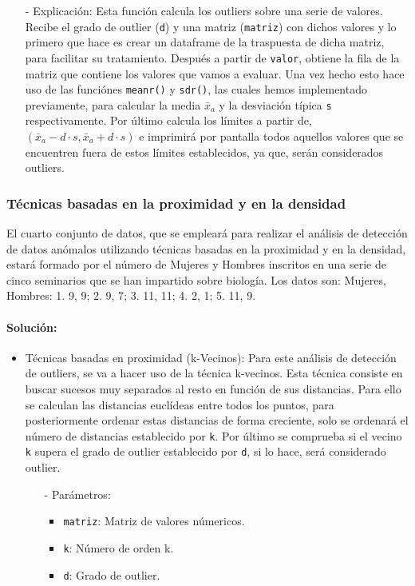 \documentclass[a4paper, 12pt]{article}
\begin{document}
{\begin{itemize}
\begin{itemize}
				\item[-] Explicación: Esta función calcula los outliers sobre una serie de valores. Recibe el grado de outlier (\texttt{d}) y una matriz (\texttt{matriz}) con dichos valores y lo primero que hace es crear un dataframe de la traspuesta de dicha matriz, para facilitar su tratamiento. Después a partir de \texttt{valor}, obtiene la fila de la matriz que contiene los valores que vamos a evaluar. Una vez hecho esto hace uso de las funciónes \texttt{meanr()} y \texttt{sdr()}, las cuales hemos implementado previamente, para calcular la media \texttt{$\bar{x}$$_{a}$} y la desviación típica \texttt{s} respectivamente. Por último calcula los límites a partir de, \texttt{$(\bar{x}_{a} - d \cdot s, \bar{x}_{a} + d \cdot s)$} e imprimirá por pantalla todos aquellos valores que se encuentren fuera de estos límites establecidos, ya que, serán considerados outliers.
			\end{itemize}
		\end{itemize}
		
		\subsubsection{Técnicas basadas en la proximidad y en la densidad}
		El cuarto conjunto de datos, que se empleará para realizar el análisis de detección de datos anómalos utilizando técnicas basadas en la proximidad y en la densidad, estará formado por el número de Mujeres y Hombres inscritos en una serie de cinco seminarios que se han impartido sobre biología. Los datos son: {Mujeres, Hombres}: 1. {9, 9}; 2. {9, 7}; 3. {11, 11}; 4. {2, 1}; 5. {11, 9}.
		
		\paragraph{Solución:}
		\begin{itemize}
			\item Técnicas basadas en proximidad (k-Vecinos): Para este análisis de detección de outliers, se va a hacer uso de la técnica k-vecinos. Esta técnica consiste en buscar sucesos muy separados al resto en función de sus distancias. Para ello se calculan las distancias euclídeas entre todos los puntos, para posteriormente ordenar estas distancias de forma creciente, solo se ordenará el número de distancias establecido por \texttt{k}. Por último se comprueba si el vecino \texttt{k} supera el grado de outlier establecido por \texttt{d}, si lo hace, será considerado outlier.
			\begin{itemize}
				\item[-] Parámetros:
				\begin{itemize}
					\item \texttt{matriz}: Matriz de valores númericos.
					\item \texttt{k}: Número de orden k.
					\item \texttt{d}: Grado de outlier.
				\end{itemize}
				

\end{itemize}
\end{itemize}}
\end{document}

